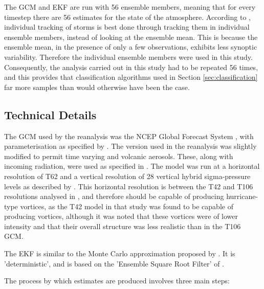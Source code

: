 \documentclass[pdftex,12pt,a4paper]{report}
\begin{document}
The GCM and EKF are run with 56 ensemble members, meaning that for every timestep there are 56
estimates for the state of the atmosphere. According to \textcite{compoTwentieth2011}, individual
tracking of storms is best done through tracking them in individual ensemble members, instead of
looking at the ensemble mean. This is because the ensemble mean, in the presence of only a few
observations, exhibits less synoptic variability. %
Therefore the individual ensemble members were used in this study. Consequently, the analysis
carried out in this study had to be repeated 56 times, and this provides that classification
algorithms used in Section \ref{sec:classification} far more samples than would otherwise have been
the case.

\subsection{Technical Details}

The GCM used by the reanalysis was the NCEP Global Forecast System
\parencite{kanamitsu1989description, kanamitsu1991recent}, with
parameterisation as specified by \textcite{saha2006ncep}. The version used in the reanalysis was
slightly modified to permit time varying  and volcanic aerosols. These, along with incoming
radiation, were used as specified in \textcite{saha2010ncep}. The model was run at a horizontal
resolution of T62 and a vertical resolution of 28 vertical hybrid sigma-pressure levels as described
by \textcite{juang2005discrete}. This horizontal resolution is between the T42 and T106 resolutions
analysed in \textcite{bengtsson1995hurricane}, and therefore should be capable of producing
hurricane-type vortices, as the T42 model in that study was found to be capable of producing
vortices, although it was noted that these vortices were of lower intensity and that their overall
structure was less realistic than in the T106 GCM. 

The EKF is similar to the Monte Carlo approximation proposed by \textcite{evensen1994sequential,
evensen2003ensemble}. It is 'deterministic', and is based on the 'Ensemble Square Root Filter' of
\textcite{whitaker2002ensemble}.

The process by which estimates are produced involves three main steps: 
\end{document}
